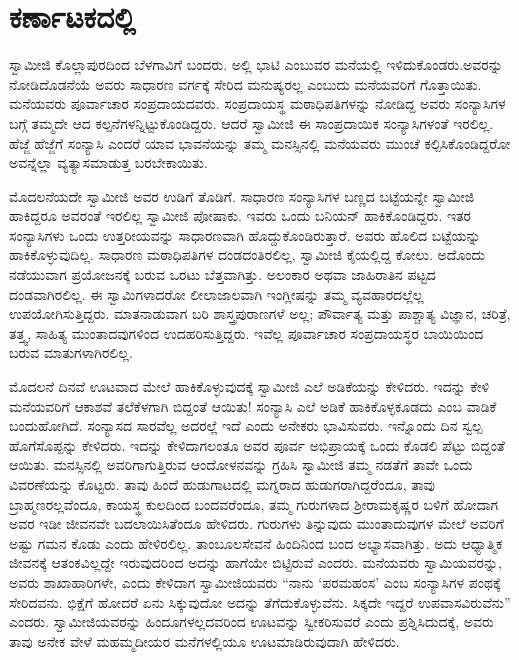 
\chapter{ಕರ್ಣಾಟಕದಲ್ಲಿ}

 ಸ್ವಾಮೀಜಿ ಕೊಲ್ಲಾಪುರದಿಂದ ಬೆಳಗಾವಿಗೆ ಬಂದರು. ಅಲ್ಲಿ ಭಾಟಿ ಎಂಬುವರ ಮನೆಯಲ್ಲಿ ಇಳಿದುಕೊಂಡರು.ಅವರನ್ನು ನೋಡಿದೊಡನೆಯೆ ಅವರು ಸಾಧಾರಣ ವರ್ಗಕ್ಕೆ ಸೇರಿದ ಮನುಷ್ಯರಲ್ಲ ಎಂಬುದು ಮನೆಯವರಿಗೆ ಗೊತ್ತಾಯಿತು. ಮನೆಯವರು ಪೂರ್ವಾಚಾರ ಸಂಪ್ರದಾಯದವರು. ಸಂಪ್ರದಾಯಸ್ಥ ಮಠಾಧಿಪತಿಗಳನ್ನು ನೋಡಿದ್ದ ಅವರು ಸಂನ್ಯಾಸಿಗಳ ಬಗ್ಗೆ ತಮ್ಮದೇ ಆದ ಕಲ್ಪನೆಗಳನ್ನಿಟ್ಟುಕೊಂಡಿದ್ದರು. ಆದರೆ ಸ್ವಾಮೀಜಿ ಈ ಸಾಂಪ್ರದಾಯಿಕ ಸಂನ್ಯಾಸಿಗಳಂತೆ ಇರಲಿಲ್ಲ. ಹೆಜ್ಜೆ ಹೆಜ್ಜೆಗೆ ಸಂನ್ಯಾಸಿ ಎಂದರೆ ಯಾವ ಭಾವನೆಯನ್ನು ತಮ್ಮ ಮನಸ್ಸಿನಲ್ಲಿ ಮನೆಯವರು ಮುಂಚೆ ಕಲ್ಪಿಸಿಕೊಂಡಿದ್ದರೋ ಅವನ್ನೆಲ್ಲಾ ವ್ಯತ್ಯಾಸಮಾಡುತ್ತ ಬರಬೇಕಾಯಿತು. 

 ಮೊದಲನೆಯದೇ ಸ್ವಾಮೀಜಿ ಅವರ ಉಡಿಗೆ ತೊಡಿಗೆ. ಸಾಧಾರಣ ಸಂನ್ಯಾಸಿಗಳ ಬಣ್ಣದ ಬಟ್ಟೆಯನ್ನೇ ಸ್ವಾಮೀಜಿ ಹಾಕಿದ್ದರೂ ಅವರಂತೆ ಇರಲಿಲ್ಲ ಸ್ವಾಮೀಜಿ ಪೋಷಾಕು. ಇವರು ಒಂದು ಬನಿಯನ್ ಹಾಕಿಕೊಂಡಿದ್ದರು. ಇತರ ಸಂನ್ಯಾಸಿಗಳು ಒಂದು ಉತ್ತರೀಯವನ್ನು ಸಾಧಾರಣವಾಗಿ ಹೊದ್ದುಕೊಂಡಿರುತ್ತಾರೆ. ಅವರು ಹೊಲಿದ ಬಟ್ಟೆಯನ್ನು ಹಾಕಿಕೊಳ್ಳುವುದಿಲ್ಲ. ಸಾಧಾರಣ ಮಠಾಧಿಪತಿಗಳ ದಂಡದಂತಿರಲಿಲ್ಲ, ಸ್ವಾಮೀಜಿ ಕೈಯಲ್ಲಿದ್ದ ಕೋಲು. ಅದೊಂದು ನಡೆಯುವಾಗ ಪ್ರಯೋಜನಕ್ಕೆ ಬರುವ ಒರಟು ಬೆತ್ತವಾಗಿತ್ತು. ಅಲಂಕಾರ ಅಥವಾ ಜಾಹಿರಾತಿನ ಪಟ್ಟದ ದಂಡವಾಗಿರಲಿಲ್ಲ. ಈ ಸ್ವಾಮಿಗಳಾದರೋ ಲೀಲಾಜಾಲವಾಗಿ ಇಂಗ್ಲೀಷನ್ನು ತಮ್ಮ ವ್ಯವಹಾರದಲ್ಲೆಲ್ಲ ಉಪಯೋಗಿಸುತ್ತಿದ್ದರು. ಮಾತನಾಡುವಾಗ ಬರಿ ಶಾಸ್ತ್ರಪುರಾಣಗಳೆ ಅಲ್ಲ; ಪೌರ್ವಾತ್ಯ ಮತ್ತು ಪಾಶ್ಚಾತ್ಯ ವಿಜ್ಞಾನ, ಚರಿತ್ರೆ, ತತ್ತ್ವ, ಸಾಹಿತ್ಯ ಮುಂತಾದವುಗಳಿಂದ ಉದಹರಿಸುತ್ತಿದ್ದರು. ಇವೆಲ್ಲ ಪೂರ್ವಾಚಾರ ಸಂಪ್ರದಾಯಸ್ಥರ ಬಾಯಿಯಿಂದ ಬರುವ ಮಾತುಗಳಾಗಿರಲಿಲ್ಲ. 

 ಮೊದಲನೆ ದಿನವೆ ಊಟವಾದ ಮೇಲೆ ಹಾಕಿಕೊಳ್ಳುವುದಕ್ಕೆ ಸ್ವಾಮೀಜಿ ಎಲೆ ಅಡಿಕೆಯನ್ನು ಕೇಳಿದರು. ಇದನ್ನು ಕೇಳಿ ಮನೆಯವರಿಗೆ ಆಕಾಶವೆ ತಲೆಕೆಳಗಾಗಿ ಬಿದ್ದಂತೆ ಆಯಿತು! ಸಂನ್ಯಾಸಿ ಎಲೆ ಅಡಿಕೆ ಹಾಕಿಕೊಳ್ಳಕೂಡದು ಎಂಬ ವಾಡಿಕೆ ಬಂದುಹೋಗಿದೆ. ಸಂನ್ಯಾಸದ ಸಾರವೆಲ್ಲ ಅದರಲ್ಲೆ ಇದೆ ಎಂದು ಅನೇಕರು ಭಾವಿಸುವರು. ಇನ್ನೊಂದು ದಿನ ಸ್ವಲ್ಪ ಹೊಗೆಸೊಪ್ಪನ್ನು ಕೇಳಿದರು. ಇದನ್ನು ಕೇಳಿದಾಗಲಂತೂ ಅವರ ಪೂರ್ವ ಅಭಿಪ್ರಾಯಕ್ಕೆ ಒಂದು ಕೊಡಲಿ ಪೆಟ್ಟು ಬಿದ್ದಂತೆ ಆಯಿತು. ಮನಸ್ಸಿನಲ್ಲಿ ಅವರಿಗಾಗುತ್ತಿರುವ ಆಂದೋಳನವನ್ನು ಗ್ರಹಿಸಿ ಸ್ವಾಮೀಜಿ ತಮ್ಮ ನಡತೆಗೆ ತಾವೇ ಒಂದು ವಿವರಣೆಯನ್ನು ಕೊಟ್ಟರು. ತಾವು ಹಿಂದೆ ಹುಡುಗಾಟದಲ್ಲಿ ಮಗ್ನರಾದ ಹುಡುಗರಾಗಿದ್ದರೆಂದೂ, ತಾವು ಬ್ರಾಹ್ಮಣರಲ್ಲವೆಂದೂ, ಕಾಯಸ್ಥ ಕುಲದಿಂದ ಬಂದವರೆಂದೂ, ತಮ್ಮ ಗುರುಗಳಾದ ಶ‍್ರೀರಾಮಕೃಷ್ಣರ ಬಳಿಗೆ ಹೋದಾಗ ಅವರ ಇಡೀ ಜೀವನವೇ ಬದಲಾಯಿಸಿತೆಂದೂ ಹೇಳಿದರು. ಗುರುಗಳು ತಿನ್ನುವುದು ಮುಂತಾದುವುಗಳ ಮೇಲೆ ಅವರಿಗೆ ಅಷ್ಟು ಗಮನ ಕೊಡು ಎಂದು ಹೇಳಿರಲಿಲ್ಲ. ತಾಂಬೂಲಸೇವನೆ ಹಿಂದಿನಿಂದ ಬಂದ ಅಭ್ಯಾಸವಾಗಿತ್ತು. ಅದು ಆಧ್ಯಾತ್ಮಿಕ ಜೀವನಕ್ಕೆ ಆತಂಕವಿಲ್ಲದ್ದೇ ಇರುವುದರಿಂದ ಅದನ್ನು ಹಾಗೆಯೇ ಬಿಟ್ಟಿರುವೆ ಎಂದರು. ಮನೆಯವರು ಸ್ವಾಮಿಯವರನ್ನು, ಅವರು ಶಾಖಾಹಾರಿಗಳೇ, ಎಂದು ಕೇಳಿದಾಗ ಸ್ವಾಮೀಜಿಯವರು “ನಾನು ‘ಪರಮಹಂಸ’ ಎಂಬ ಸಂನ್ಯಾಸಿಗಳ ಪಂಥಕ್ಕೆ ಸೇರಿದವನು. ಭಿಕ್ಷೆಗೆ ಹೋದರೆ ಏನು ಸಿಕ್ಕುವುದೋ ಅದನ್ನು ತೆಗೆದುಕೊಳ್ಳುವೆನು. ಸಿಕ್ಕದೇ ಇದ್ದರೆ ಉಪವಾಸವಿರುವೆನು” ಎಂದರು. ಸ್ವಾಮೀಜಿಯವರನ್ನು ಹಿಂದೂಗಳಲ್ಲದವರಿಂದ ಊಟವನ್ನು ಸ್ವೀಕರಿಸುವರೆ ಎಂದು ಪ್ರಶ್ನಿಸಿದುದಕ್ಕೆ, ಅವರು ತಾವು ಅನೇಕ ವೇಳೆ ಮಹಮ್ಮದೀಯರ ಮನೆಗಳಲ್ಲಿಯೂ ಊಟಮಾಡಿರುವುದಾಗಿ ಹೇಳಿದರು. 

